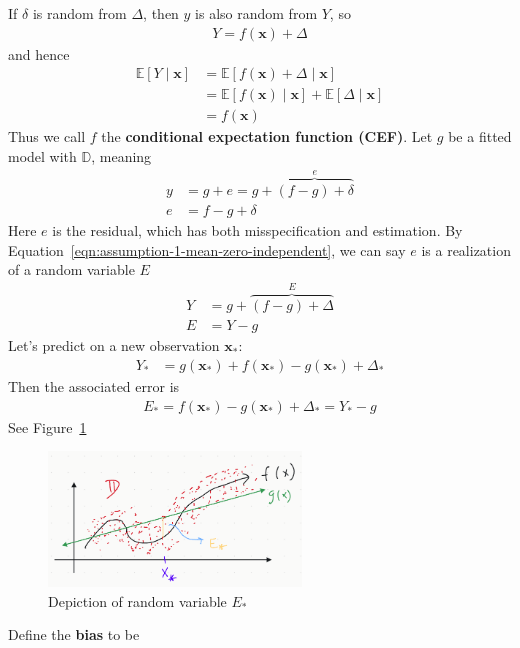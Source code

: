 \documentclass[12pt, a4paper]{article}
\theoremstyle{definition}
\begin{document}
	If $\delta$ is random from
	$\Delta$, then $y$ is also random from $Y$, so
	\begin{align}
		Y = f(\bm{x}) + \Delta
		\label{eqn:Y-rv-on-Delta}
	\end{align}
	and hence
	\begin{align}
		\mathbb{E}[Y \mid \bm{x}]
		&= \mathbb{E}[f(\bm{x}) + \Delta \mid \bm{x}]\nonumber\\
		&=\mathbb{E}[f(\bm{x})\mid \bm{x}] + \mathbb{E}[\Delta \mid \bm{x}]\nonumber\\
		&= f(\bm{x})
		\tag{by (I)}
	\end{align}
	Thus we call $f$ the \textbf{conditional expectation function (CEF)}.
	Let $g$ be a fitted model with $\mathbb{D}$, meaning
	\begin{align*}
		y &= g + e = g + \overbrace{(f - g) + \delta}^{e}\\
		e &= f - g + \delta
	\end{align*}
	Here $e$ is the residual, which has both misspecification and estimation.
	By Equation~\ref{eqn:assumption-1-mean-zero-independent}, we can say $e$ is a
	realization of a random variable $E$
	\begin{align*}
		Y &= g + \overbrace{(f - g) + \Delta}^{E}\\
		E &= Y - g
	\end{align*}
	Let's predict on a new observation $\bm{x}_*$:
	\begin{align*}
		Y_* &= g(\bm{x}_*) + f(\bm{x}_*) - g(\bm{x}_*) + \Delta_*
	\end{align*}
	Then the associated error is
	\begin{align}
		E_* = f(\bm{x}_*) - g(\bm{x}_*) + \Delta_* = Y_* - g
		\label{eqn:error-rv}
	\end{align}
	See Figure~\ref{fig:prediction-error-rv}
	\begin{figure}
		\centering
		\includegraphics[width=0.6\textwidth]{prediction-error-random-variable}
		\caption{Depiction of random variable $E_*$}
		\label{fig:prediction-error-rv}
	\end{figure}
	Define the \textbf{bias} to be
\end{document}
